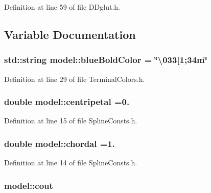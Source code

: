 Definition at line 59 of file D\+Dglut.\+h.



\subsection{Variable Documentation}
\hypertarget{namespacemodel_ae7217229d399815f042c45d4b589b768}{}
\subsubsection[{blue\+Bold\+Color}]{\setlength{\rightskip}{0pt plus 5cm}std\+::string model\+::blue\+Bold\+Color = \char`\"{}\textbackslash{}033\mbox{[}1;34m\char`\"{}}\label{namespacemodel_ae7217229d399815f042c45d4b589b768}


Definition at line 29 of file Terminal\+Colors.\+h.

\hypertarget{namespacemodel_a8934c473697d78a4cd48ee1e7e9532e9}{}
\subsubsection[{centripetal}]{\setlength{\rightskip}{0pt plus 5cm}double model\+::centripetal =0.}\label{namespacemodel_a8934c473697d78a4cd48ee1e7e9532e9}


Definition at line 15 of file Spline\+Consts.\+h.

\hypertarget{namespacemodel_ab92decb86519dc87869e1939eda61a31}{}
\subsubsection[{chordal}]{\setlength{\rightskip}{0pt plus 5cm}double model\+::chordal =1.}\label{namespacemodel_ab92decb86519dc87869e1939eda61a31}


Definition at line 14 of file Spline\+Consts.\+h.

\hypertarget{namespacemodel_a0ce25fef078a7d9d9cb7cfbabcfbc289}{}
\subsubsection[{cout}]{ model\+::cout}\label{namespacemodel_a0ce25fef078a7d9d9cb7cfbabcfbc289}


